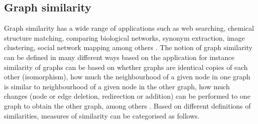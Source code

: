\documentclass[10pt,a4paper]{article}
\theoremstyle{plain}
\theoremstyle{definition}
\begin{document}
     \subsection{Graph similarity}
     Graph similarity has a wide range of applications such as web searching, chemical structure matching, comparing biological networks, synonym extraction, image clustering, social network mapping among others \citep{zager2008graph, nikolic2012measuring}. 
     The notion of graph similarity can be defined in many different ways based on the application for instance similarity of graphs can be based on whether graphs are identical copies of each other (isomorphism), how much the neighbourhood of a given node in one graph is similar to neighbourhood of a given node in the other graph, how much changes (node or edge deletion, redirection or addition) can be performed to one graph to obtain the other graph, among others \citep{zager2008graph}. Based on different definitions of similarities, measures of similarity can be categorised as follows.
\end{document}
